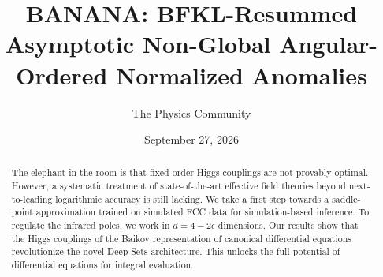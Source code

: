 \documentclass[11pt]{article}
\title{BANANA: BFKL-Resummed Asymptotic Non-Global Angular-Ordered Normalized Anomalies}
\author{The Physics Community}
\date{September 27, 2026}
\begin{document}
\maketitle
\begin{abstract}
The elephant in the room is that fixed-order Higgs couplings are not
provably optimal. However, a systematic treatment of state-of-the-art
effective field theories beyond next-to-leading logarithmic accuracy is
still lacking. We take a first step towards a saddle-point approximation
trained on simulated FCC data for simulation-based inference. To
regulate the infrared poles, we work in $d = 4 - 2\epsilon$ dimensions.
Our results show that the Higgs couplings of the Baikov representation
of canonical differential equations revolutionize the novel Deep Sets
architecture. This unlocks the full potential of differential equations
for integral evaluation.
\end{abstract}
\tableofcontents




\nocite{*}


\end{document}
